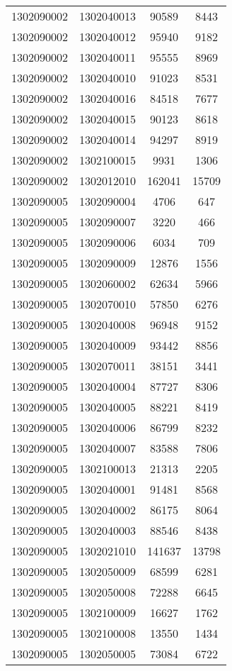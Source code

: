 \begin{longtable}[h]{llcc}
		1302090002 & 1302040013 & 90589 & 8443\\
		1302090002 & 1302040012 & 95940 & 9182\\
		1302090002 & 1302040011 & 95555 & 8969\\
		1302090002 & 1302040010 & 91023 & 8531\\
		1302090002 & 1302040016 & 84518 & 7677\\
		1302090002 & 1302040015 & 90123 & 8618\\
		1302090002 & 1302040014 & 94297 & 8919\\
		1302090002 & 1302100015 & 9931 & 1306\\
		1302090002 & 1302012010 & 162041 & 15709\\
		1302090005 & 1302090004 & 4706 & 647\\
		1302090005 & 1302090007 & 3220 & 466\\
		1302090005 & 1302090006 & 6034 & 709\\
		1302090005 & 1302090009 & 12876 & 1556\\
		1302090005 & 1302060002 & 62634 & 5966\\
		1302090005 & 1302070010 & 57850 & 6276\\
		1302090005 & 1302040008 & 96948 & 9152\\
		1302090005 & 1302040009 & 93442 & 8856\\
		1302090005 & 1302070011 & 38151 & 3441\\
		1302090005 & 1302040004 & 87727 & 8306\\
		1302090005 & 1302040005 & 88221 & 8419\\
		1302090005 & 1302040006 & 86799 & 8232\\
		1302090005 & 1302040007 & 83588 & 7806\\
		1302090005 & 1302100013 & 21313 & 2205\\
		1302090005 & 1302040001 & 91481 & 8568\\
		1302090005 & 1302040002 & 86175 & 8064\\
		1302090005 & 1302040003 & 88546 & 8438\\
		1302090005 & 1302021010 & 141637 & 13798\\
		1302090005 & 1302050009 & 68599 & 6281\\
		1302090005 & 1302050008 & 72288 & 6645\\
		1302090005 & 1302100009 & 16627 & 1762\\
		1302090005 & 1302100008 & 13550 & 1434\\
		1302090005 & 1302050005 & 73084 & 6722\\

\end{longtable}
